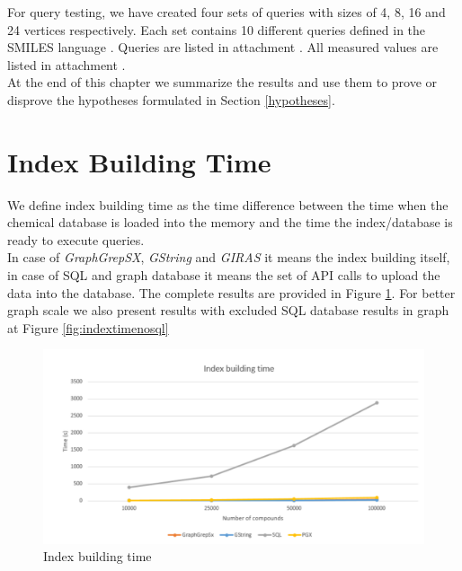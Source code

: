 For query testing, we have created four sets of queries with sizes of 4, 8, 16 and 24 vertices respectively. Each set contains 10 different queries defined in the SMILES language \cite{smiles}. Queries are listed in attachment . All measured values are listed in attachment .\\

At the end of this chapter we summarize the results and use them to prove or disprove the hypotheses formulated in Section \ref{hypotheses}.

\section{Index Building Time}

We define index building time as the time difference between the time when the chemical database is loaded into the memory and the time the index/database is ready to execute queries.\\

In case of \textit{GraphGrepSX}, \textit{GString} and \textit{GIRAS} it means the index building itself, in case of SQL and graph database it means the set of API calls to upload the data into the database. The complete results are provided in Figure \ref{fig:indextime}. For better graph scale we also present results with excluded SQL database results in graph at Figure \ref{fig:indextimenosql}\\

\begin{figure}[h]
	\centering
	\includegraphics[width=1\textwidth]{../img/indexBuildingTime.pdf}
	\caption{Index building time}
	\label{fig:indextime}
\end{figure}

